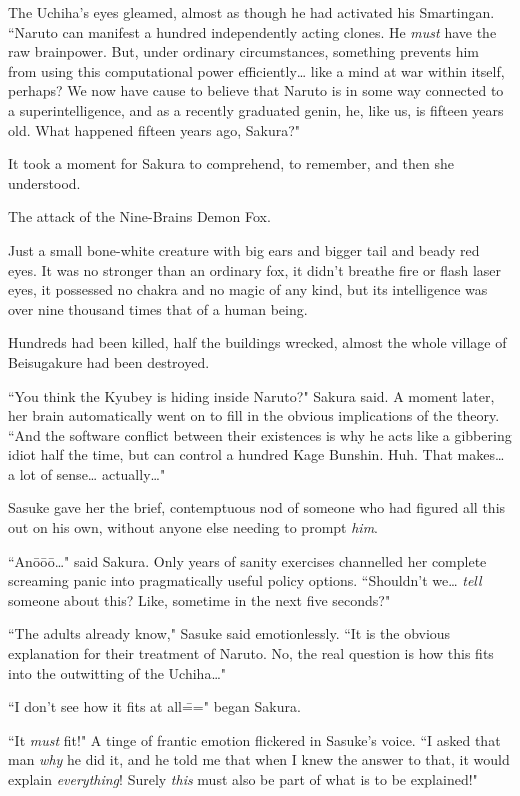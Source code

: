 The Uchiha's eyes gleamed, almost as though he had activated his Smartingan. ``Naruto can manifest a hundred independently acting clones. He \emph{must} have the raw brainpower. But, under ordinary circumstances, something prevents him from using this computational power efficiently{\ldots} like a mind at war within itself, perhaps? We now have cause to believe that Naruto is in some way connected to a superintelligence, and as a recently graduated genin, he, like us, is fifteen years old. What happened fifteen years ago, Sakura?"

It took a moment for Sakura to comprehend, to remember, and then she understood.

The attack of the Nine-Brains Demon Fox.

Just a small bone-white creature with big ears and bigger tail and beady red eyes. It was no stronger than an ordinary fox, it didn't breathe fire or flash laser eyes, it possessed no chakra and no magic of any kind, but its intelligence was over nine thousand times that of a human being.

Hundreds had been killed, half the buildings wrecked, almost the whole village of Beisugakure had been destroyed.

``You think the Kyubey is hiding inside Naruto?" Sakura said. A moment later, her brain automatically went on to fill in the obvious implications of the theory. ``And the software conflict between their existences is why he acts like a gibbering idiot half the time, but can control a hundred Kage Bunshin. Huh. That makes{\ldots} a lot of sense{\ldots} actually{\ldots}"

Sasuke gave her the brief, contemptuous nod of someone who had figured all this out on his own, without anyone else needing to prompt \emph{him}.

``Anōōō{\ldots}" said Sakura. Only years of sanity exercises channelled her complete screaming panic into pragmatically useful policy options. ``Shouldn't we{\ldots} \emph{tell} someone about this? Like, sometime in the next five seconds?"

``The adults already know," Sasuke said emotionlessly. ``It is the obvious explanation for their treatment of Naruto. No, the real question is how this fits into the outwitting of the Uchiha{\ldots}"

``I don't see how it fits at all\===" began Sakura.

``It \emph{must} fit!" A tinge of frantic emotion flickered in Sasuke's voice. ``I asked that man \emph{why} he did it, and he told me that when I knew the answer to that, it would explain \emph{everything}! Surely \emph{this} must also be part of what is to be explained!"

